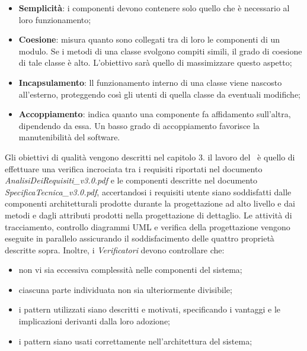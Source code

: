 \begin{itemize}
	\item \textbf{Semplicità}: i componenti devono contenere solo quello che è necessario al loro funzionamento;
	\item \textbf{Coesione}: misura quanto sono collegati tra di loro le componenti di un modulo. Se i metodi di una classe svolgono compiti simili, il grado di coesione di tale classe è alto. L'obiettivo sarà quello di massimizzare questo aspetto;
	\item \textbf{Incapsulamento}: ll funzionamento interno di una classe viene nascosto all'esterno, proteggendo così gli utenti di quella classe da eventuali modifiche;
	\item \textbf{Accoppiamento}: indica quanto una componente fa affidamento sull'altra, dipendendo da essa. Un basso grado di accoppiamento favorisce la manutenibilità del software.
\end{itemize}
Gli obiettivi di qualità vengono descritti nel capitolo 3. il lavoro del  \ruoloVerificatore\ è quello di effettuare una verifica incrociata tra i requisiti riportati nel documento\textit{ AnalisiDeiRequisiti\_v3.0.pdf} e le componenti descritte nel documento \textit{SpecificaTecnica\_v3.0.pdf}, accertandosi  i requisiti utente siano soddisfatti  dalle componenti architetturali prodotte durante la progettazione ad alto livello e dai metodi e dagli attributi prodotti nella progettazione di dettaglio.
Le attività di tracciamento, controllo diagrammi UML e verifica della progettazione vengono eseguite in parallelo assicurando il soddisfacimento delle quattro proprietà descritte sopra. Inoltre, i \textit{Verificatori} devono controllare che:

\begin{itemize}
	\item non vi sia eccessiva complessità nelle componenti del sistema;
	\item ciascuna parte individuata non sia ulteriormente divisibile;
	\item i pattern utilizzati siano descritti e motivati, specificando i vantaggi e le implicazioni derivanti dalla loro adozione;
	\item i pattern siano usati correttamente nell'architettura del sistema;
\end{itemize}

